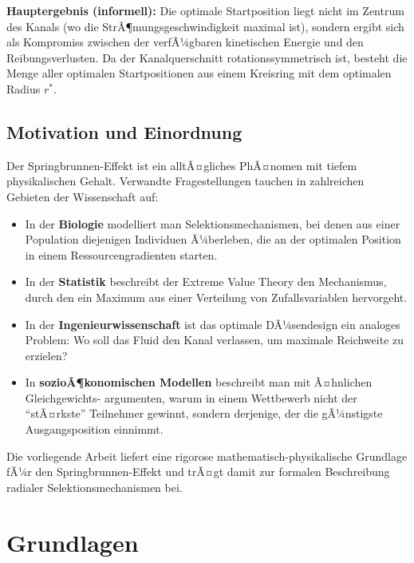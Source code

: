 ﻿\documentclass[a4paper,12pt]{article}
\theoremstyle{definition}
\begin{document}
\textbf{Hauptergebnis (informell):} Die optimale Startposition liegt nicht im Zentrum des
Kanals (wo die StrÃ¶mungsgeschwindigkeit maximal ist), sondern ergibt sich als Kompromiss
zwischen der verfÃ¼gbaren kinetischen Energie und den Reibungsverlusten. Da der
Kanalquerschnitt rotationssymmetrisch ist, besteht die Menge aller optimalen
Startpositionen aus einem Kreisring mit dem optimalen Radius $r^*$.

\subsection{Motivation und Einordnung}

Der Springbrunnen-Effekt ist ein alltÃ¤gliches PhÃ¤nomen mit tiefem physikalischen Gehalt.
Verwandte Fragestellungen tauchen in zahlreichen Gebieten der Wissenschaft auf:

\begin{itemize}
    \item In der \textbf{Biologie} modelliert man Selektionsmechanismen, bei denen aus
          einer Population diejenigen Individuen Ã¼berleben, die an der optimalen Position
          in einem Ressourcengradienten starten.
    \item In der \textbf{Statistik} beschreibt der Extreme Value Theory den Mechanismus,
          durch den ein Maximum aus einer Verteilung von Zufallsvariablen hervorgeht.
    \item In der \textbf{Ingenieurwissenschaft} ist das optimale DÃ¼sendesign ein analoges
          Problem: Wo soll das Fluid den Kanal verlassen, um maximale Reichweite zu erzielen?
    \item In \textbf{sozioÃ¶konomischen Modellen} beschreibt man mit Ã¤hnlichen Gleichgewichts-
          argumenten, warum in einem Wettbewerb nicht der ``stÃ¤rkste'' Teilnehmer gewinnt,
          sondern derjenige, der die gÃ¼nstigste Ausgangsposition einnimmt.
\end{itemize}

Die vorliegende Arbeit liefert eine rigorose mathematisch-physikalische Grundlage fÃ¼r
den Springbrunnen-Effekt und trÃ¤gt damit zur formalen Beschreibung radialer
Selektionsmechanismen bei.

\section{Grundlagen}
\end{document}

